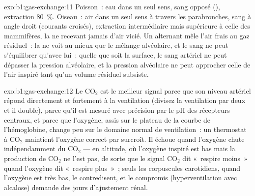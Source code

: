 \begin{solution}{exo:b1:gas-exchange:11}
Poisson~: eau dans un seul sens, sang opposé (),
extraction \qty{80}{\%}. Oiseau~: air dans un seul sens à travers les
parabronches, sang à angle droit (courants croisés), extraction
intermédiaire mais supérieure à celle des mammifères, la  ne recevant jamais d'air vicié. Un  alternant mêle
l'air frais au gaz résiduel~: la  ne voit au mieux que
le mélange alvéolaire, et le sang ne peut s'équilibrer qu'avec lui~:
quelle que soit la surface, le sang artériel ne peut dépasser la
pression alvéolaire, et la pression alvéolaire ne peut approcher celle
de l'air inspiré tant qu'un volume résiduel subsiste.
\end{solution}

\begin{solution}{exo:b1:gas-exchange:12}
Le $\mathrm{CO_2}$ est le meilleur signal parce que son niveau artériel
répond directement et fortement à la ventilation (divisez la
ventilation par deux et il double), parce qu'il est mesuré avec
précision par le pH des récepteurs centraux, et parce que l'oxygène,
assis sur le plateau de la courbe de l'hémoglobine, change peu sur le
domaine normal de ventilation~: un thermostat à
$\mathrm{CO_2}$ maintient l'oxygène correct par surcroît. Il échoue
quand l'oxygène chute indépendamment du $\mathrm{CO_2}$ --- en altitude,
où l'oxygène inspiré est bas mais la production de $\mathrm{CO_2}$ ne
l'est pas, de sorte que le signal $\mathrm{CO_2}$ dit «~respire moins~»
quand l'oxygène dit «~respire plus~»~; seuls les corpuscules
carotidiens, quand l'oxygène est très bas, le contredisent, et le
compromis (hyperventilation avec alcalose) demande des jours
d'ajustement rénal.
\end{solution}

